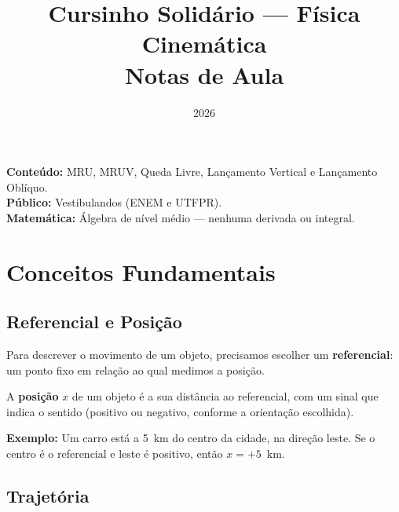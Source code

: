 \documentclass[12pt,a4paper]{article}
\title{
  \textbf{\large Cursinho Solid\'ario --- F\'isica}\\[0.5em]
  \textbf{\Huge Cinem\'atica}\\[0.3em]
  \large Notas de Aula
}
\author{}
\date{2026}
\begin{document}

\maketitle
\thispagestyle{empty}

\vspace{1em}
\begin{tcolorbox}[colback=azulphysics!5!white, colframe=azulphysics, arc=3mm]
  \textbf{Conte\'udo:} MRU, MRUV, Queda Livre, Lan\c{c}amento Vertical e
  Lan\c{c}amento Obl\'iquo.\\
  \textbf{P\'ublico:} Vestibulandos (ENEM e UTFPR).\\
  \textbf{Matem\'atica:} \'{A}lgebra de n\'ivel m\'edio --- nenhuma derivada ou integral.
\end{tcolorbox}

\tableofcontents
\newpage

\section{Conceitos Fundamentais}

\subsection{Referencial e Posi\c{c}\~ao}

Para descrever o movimento de um objeto, precisamos escolher um
\textbf{referencial}: um ponto fixo em rela\c{c}\~ao ao qual medimos a posi\c{c}\~ao.

\begin{tcolorbox}[defbox={Defini\c{c}\~ao: Posi\c{c}\~ao}]
  A \textbf{posi\c{c}\~ao} $x$ de um objeto \'e a sua dist\^ancia ao referencial,
  com um sinal que indica o sentido
  (positivo ou negativo, conforme a orienta\c{c}\~ao escolhida).
\end{tcolorbox}

\textbf{Exemplo:} Um carro est\'a a 5~km do centro da cidade, na dire\c{c}\~ao
leste. Se o centro \'e o referencial e leste \'e positivo, ent\~ao $x = +5$~km.

\subsection{Trajet\'oria}
\end{document}
